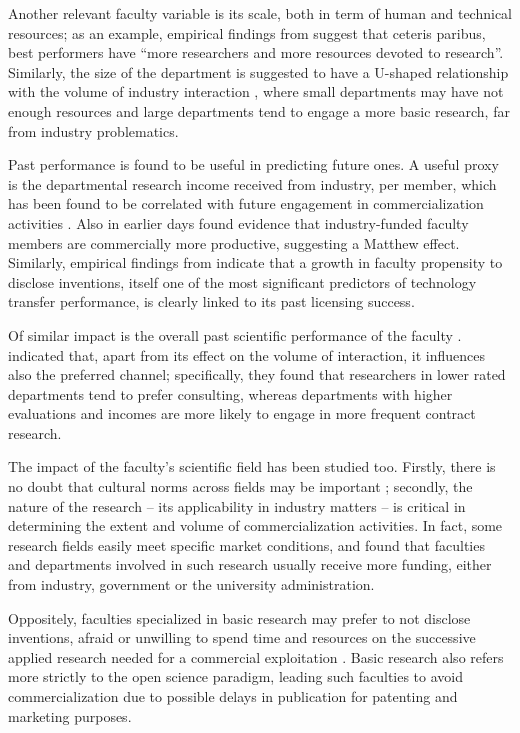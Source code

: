 Another relevant faculty variable is its scale, both in term of human and technical resources; as an example, empirical findings from \citet{OwenSmith2001} suggest that ceteris paribus, best performers have \enquote{more researchers and more resources devoted to research}. Similarly, the size of the department is suggested to have a U-shaped relationship with the volume of industry interaction \citep{DEste2007}, where small departments may have not enough resources and large departments tend to engage a more basic research, far from industry problematics.

Past performance is found to be useful in predicting future ones. A useful proxy is the departmental research income received from industry, per member, which has been found to be correlated with future engagement in commercialization activities \citep{DEste2007}. Also \citet{Blumenthal1996} in earlier days found evidence that industry-funded faculty members are commercially more productive, suggesting a Matthew effect. Similarly, empirical findings from \citet{Thursby2002} indicate that a growth in faculty propensity to disclose inventions, itself one of the most significant predictors of technology transfer performance, is clearly linked to its past licensing success. 

Of similar impact is the overall past scientific performance of the faculty \citep{OShea2005}. \citet{DEste2011} indicated that, apart from its effect on the volume of interaction, it influences also the preferred channel; specifically, they found that researchers in lower rated departments tend to prefer consulting, whereas departments with higher evaluations and incomes are more likely to engage in more frequent contract research.

The impact of the faculty's scientific field has been studied too. Firstly, there is no doubt that cultural norms across fields may be important \citep{DEste2007}; secondly, the nature of the research – its applicability in industry matters – is critical in determining the extent and volume of commercialization activities. In fact, some research fields easily meet specific market conditions, and \citet{OShea2005} found that faculties and departments involved in such research usually receive more funding, either from industry, government or the university administration.

Oppositely, faculties specialized in basic research may prefer to not disclose inventions, afraid or unwilling to spend time and resources on the successive applied research needed for a commercial exploitation \citep{Bercovitz2006}. Basic research also refers more strictly to the open science paradigm, leading such faculties to avoid commercialization due to possible delays in publication for patenting and marketing purposes. 

